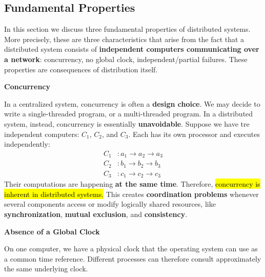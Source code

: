 \subsection{Fundamental Properties}\label{subsec:introduction--fundamental-properties}

In this section we discuss three fundamental properties of distributed systems. More precisely, these are three characteristics that arise from the fact that a distributed system consists of \textbf{independent computers communicating over a network}: concurrency, no global clock, independent/partial failures. These properties are consequences of distribution itself.

\highspace
\begin{flushleft}
    \textcolor{Green3}{ \textbf{Concurrency}}
\end{flushleft}
In a centralized system, concurrency is often a \textbf{design choice}. We may decide to write a single-threaded program, or a multi-threaded program. In a distributed system, instead, concurrency is essentially \textbf{unavoidable}. Suppose we have tre independent computers: $C_1$, $C_2$, and $C_3$. Each has its own processor and executes independently:
\begin{equation*}
    \begin{aligned}
        C_1 &: a_1 \rightarrow a_2 \rightarrow a_3\\
        C_2 &: b_1 \rightarrow b_2 \rightarrow b_3\\
        C_3 &: c_1 \rightarrow c_2 \rightarrow c_3
    \end{aligned}
\end{equation*}
Their computations are happening \textbf{at the same time}. Therefore, \hl{concurrency is inherent in distributed systems.} This creates \textbf{coordination problems} whenever several components access or modify logically shared resources, like \textbf{synchronization}, \textbf{mutual exclusion}, and \textbf{consistency}.

\highspace
\begin{flushleft}
    \textcolor{Green3}{ \textbf{Absence of a Global Clock}}
\end{flushleft}
On one computer, we have a physical clock that the operating system can use as a common time reference. Different processes can therefore consult approximately the same underlying clock.

